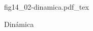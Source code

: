 \begin{figure}[h]
\centering
\def\svgwidth{0.5\textwidth}
{fig14_02-dinamica.pdf_tex}
\caption{Dinámica}
\label{fig14_02-dinamica}
\end{figure}